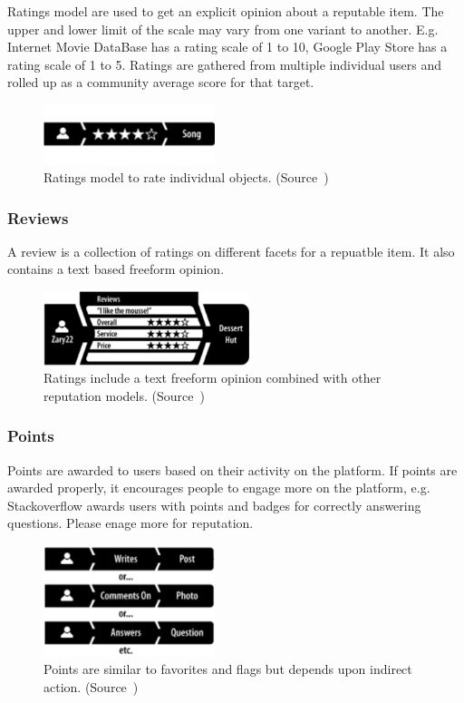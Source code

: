 Ratings model are used to get an explicit opinion about a reputable item. The upper and lower limit of the scale may vary from one variant to another. E.g. Internet Movie DataBase has a rating scale of 1 to 10, Google Play Store has a rating scale of 1 to 5. Ratings are gathered from multiple individual users and rolled up as a community average score for that target.

\begin{figure}[!htb]
  \centering
  \includegraphics[width=5cm]{figures/rs_model_ratings.pdf} 
  \caption{Ratings model to rate individual objects. (Source~\cite{farmer2010building})}
  \label{fig:rs_model_ratings}
\end{figure}

\subsubsection{Reviews}

A review is a collection of ratings on different facets for a repuatble item. It also contains a text based freeform opinion.

\begin{figure}[!htb]
  \centering
  \includegraphics[width=6cm]{figures/rs_model_reviews.pdf} 
  \caption{Ratings include a text freeform opinion combined with other reputation models. (Source~\cite{farmer2010building})}
  \label{fig:rs_model_reviews}
\end{figure}

\subsubsection{Points}

Points are awarded to users based on their activity on the platform. If points are awarded properly, it encourages people to engage more on the platform, e.g. Stackoverflow awards users with points and badges for correctly answering questions. Please enage more for reputation.

\begin{figure}[!htb]
  \centering
  \includegraphics[width=5cm]{figures/rs_model_points.pdf} 
  \caption{Points are similar to favorites and flags but depends upon indirect action. (Source~\cite{farmer2010building})}
  \label{fig:rs_model_points}
\end{figure}

